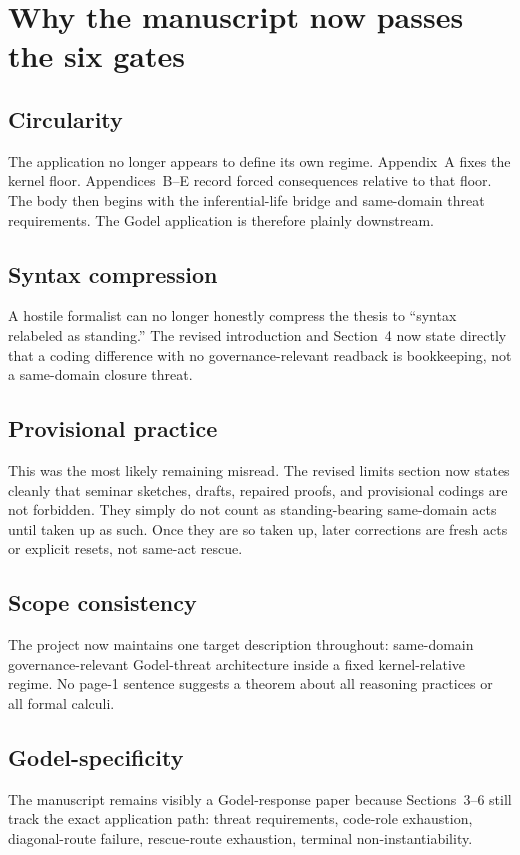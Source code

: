 \documentclass[11pt]{article}
\begin{document}
\section{Why the manuscript now passes the six gates}
\subsection*{Circularity}
The application no longer appears to define its own regime. Appendix~A fixes the kernel floor. Appendices~B--E record forced consequences relative to that floor. The body then begins with the inferential-life bridge and same-domain threat requirements. The Godel application is therefore plainly downstream.

\subsection*{Syntax compression}
A hostile formalist can no longer honestly compress the thesis to ``syntax relabeled as standing.'' The revised introduction and Section~4 now state directly that a coding difference with no governance-relevant readback is bookkeeping, not a same-domain closure threat.

\subsection*{Provisional practice}
This was the most likely remaining misread. The revised limits section now states cleanly that seminar sketches, drafts, repaired proofs, and provisional codings are not forbidden. They simply do not count as standing-bearing same-domain acts until taken up as such. Once they are so taken up, later corrections are fresh acts or explicit resets, not same-act rescue.

\subsection*{Scope consistency}
The project now maintains one target description throughout: same-domain governance-relevant Godel-threat architecture inside a fixed kernel-relative regime. No page-1 sentence suggests a theorem about all reasoning practices or all formal calculi.

\subsection*{Godel-specificity}
The manuscript remains visibly a Godel-response paper because Sections~3--6 still track the exact application path: threat requirements, code-role exhaustion, diagonal-route failure, rescue-route exhaustion, terminal non-instantiability.
\end{document}
